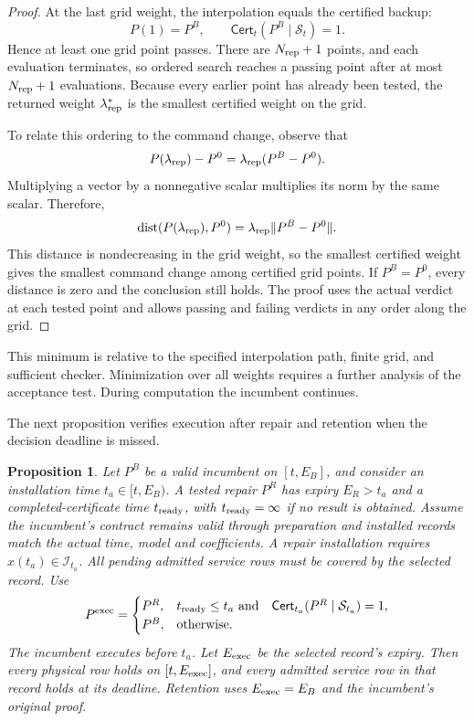 \documentclass[preprint,12pt]{elsarticle}
\newtheorem{proposition}{Proposition}
\begin{document}
\begin{proof}
At the last grid weight, the interpolation equals the certified backup:
\[
 P(1)=P^B,
 \qquad \mathsf{Cert}_t(P^B\mid\mathcal S_t)=1.
\]
Hence at least one grid point passes. There are $N_{\rm rep}+1$ points,
and each evaluation terminates, so ordered search reaches a passing point
after at most $N_{\rm rep}+1$ evaluations. Because every earlier point has
already been tested, the returned weight $\lambda_{\rm rep}^*$ is the
smallest certified weight on the grid.

To relate this ordering to the command change, observe that
\[
 P(\lambda_{\rm rep})-P^0
 =\lambda_{\rm rep}(P^B-P^0).
\]
Multiplying a vector by a nonnegative scalar multiplies its norm by the
same scalar. Therefore,
\[
 \operatorname{dist}(P(\lambda_{\rm rep}),P^0)
 =\lambda_{\rm rep}\|P^B-P^0\|.
\]
This distance is nondecreasing in the grid weight, so the smallest
certified weight gives the smallest command change among certified grid
points. If $P^B=P^0$, every distance is zero and the conclusion still holds.
The proof uses the actual verdict at each tested point and allows passing
and failing verdicts in any order along the grid.
\end{proof}

This minimum is relative to the specified interpolation path, finite grid,
and sufficient checker. Minimization over all weights requires a further
analysis of the acceptance test. During computation the incumbent continues.

The next proposition verifies execution after repair and retention when
the decision deadline is missed.

\begin{proposition}
\label{prop:repair-execution}
Let $P^B$ be a valid incumbent on $[t,E_B]$, and consider an
installation time $t_a\in[t,E_B)$. A tested repair $P^R$ has expiry
$E_R>t_a$ and a completed-certificate time $t_{\rm ready}$, with
$t_{\rm ready}=\infty$ if no result is obtained. Assume the incumbent's
contract remains valid through preparation and installed records match the
actual time, model and coefficients. A repair installation requires
$x(t_a)\in\mathcal I_{t_a}$. All pending admitted service rows must be
covered by the selected record. Use
\begin{equation}
P^{\rm exec}=\begin{cases}
P^R,&t_{\rm ready}\le t_a\ \text{and}\quad
 \mathsf{Cert}_{t_a}(P^R\mid\mathcal S_{t_a})=1,\\
P^B,&\text{otherwise}.
\end{cases}
\label{eq:repair-installation-rule}
\end{equation}
The incumbent executes before $t_a$. Let $E_{\rm exec}$ be the selected
record's expiry. Then every physical row holds on $[t,E_{\rm exec}]$,
and every admitted service row in that record holds at its deadline.
Retention uses $E_{\rm exec}=E_B$ and the incumbent's original proof.
\end{proposition}
\end{document}
